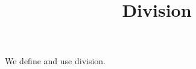 \documentclass{ximera}
\title{Division}
\begin{document}
\begin{abstract}
\end{abstract}
\maketitle

We define and use division.
\end{document}
